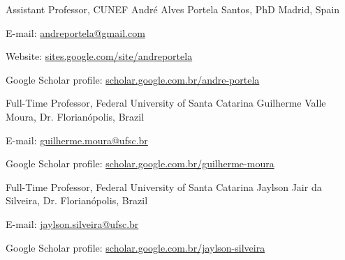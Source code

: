 

\begin{cventries}

  \cventry
    {Assistant Professor, CUNEF} %
    {André Alves Portela Santos, PhD} %
    {Madrid, Spain} %
    {} %
    {
      \begin{cvitems} %
        \item {E-mail: \href{mailto:andreportela@gmail.com}{andreportela@gmail.com}}
        \item {Website: \href{https://sites.google.com/site/andreportela}{sites.google.com/site/andreportela}}
        \item {Google Scholar profile: \href{https://scholar.google.com.br/citations?hl=pt-BR&user=S80aHqcAAAAJ}{scholar.google.com.br/andre-portela}}        
      \end{cvitems}
    }
    
  \cventry
    {Full-Time Professor, Federal University of Santa Catarina} %
    {Guilherme Valle Moura, Dr.} %
    {Florianópolis, Brazil} %
    {} %
    {
      \begin{cvitems} %
        \item {E-mail: \href{mailto:guilherme.moura@ufsc.br}{guilherme.moura@ufsc.br}}        
        \item {Google Scholar profile: \href{https://scholar.google.com.br/citations?user=OrhztjIAAAAJ&hl=en}{scholar.google.com.br/guilherme-moura}}        
      \end{cvitems}
    } 

    \cventry
    {Full-Time Professor, Federal University of Santa Catarina} %
    {Jaylson Jair da Silveira, Dr.} %
    {Florianópolis, Brazil} %
    {} %
    {
      \begin{cvitems} %
        \item {E-mail: \href{mailto:jaylson.silveira@ufsc.br}{jaylson.silveira@ufsc.br}}        
        \item {Google Scholar profile: \href{https://scholar.google.com/citations?user=EnUdUWgAAAAJ&hl=en}{scholar.google.com.br/jaylson-silveira}}        
      \end{cvitems}
    } 
  
\end{cventries}
